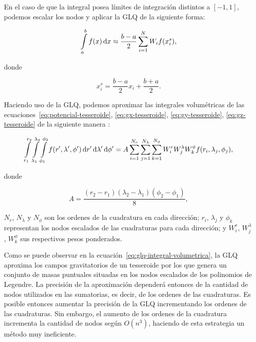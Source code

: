 En el caso de que la integral posea límites de integración distintos a
$[-1, 1]$, podemos escalar los nodos y aplicar la \ac{GLQ} de la siguiente
forma:

\begin{equation}
    \int\limits_a^b f(x) \mathop{}\!\textnormal{d} x \approx
        \frac{b - a}{2} \sum\limits_{i=1}^{N}
        W_i f(x_i^s),
\end{equation}

\noindent donde

\begin{equation}
    x_i^s = \frac{b - a}{2} x_i + \frac{b + a}{2}.
\end{equation}

Haciendo uso de la \ac{GLQ}, podemos aproximar las integrales volumétricas de
las ecuaciones~\ref{eq:potencial-tesseroide}, \ref{eq:gx-tesseroide},
\ref{eq:gy-tesseroide}, \ref{eq:gz-tesseroide} de la siguiente manera
\citep{asgharzadeh2007,uieda2016}:

\begin{equation}
    \int\limits_{r_1}^{r_2}
    \int\limits_{\lambda_1}^{\lambda_2}
    \int\limits_{\phi_1}^{\phi_2}
    f(r', \lambda', \phi')
    \mathop{}\!\textnormal{d} r' \mathop{}\!\textnormal{d} \lambda' \mathop{}\!\textnormal{d} \phi' =
    A
    \sum\limits_{i=1}^{N_r}
    \sum\limits_{j=1}^{N_\lambda}
    \sum\limits_{k=1}^{N_\phi}
    W_i^r
    W_j^\lambda
    W_k^\phi
    f(r_i, \lambda_j, \phi_j),
    \label{eq:glq-integral-volumetrica}
\end{equation}

\noindent donde

\begin{equation}
    A = \frac{
        (r_2 - r_1) (\lambda_2 - \lambda_1) (\phi_2 - \phi_1)
    }{8},
    \label{eq:glq-resize-factor}
\end{equation}

\noindent $N_r$, $N_\lambda$ y $N_\phi$ son los ordenes de la cuadratura en
cada dirección; $r_i$, $\lambda_j$ y $\phi_k$ representan los nodos escalados
de las cuadraturas para cada dirección; y $W_i^r$, $W_j^\lambda$, $W_k^\phi$
sus respectivos pesos ponderados.

Como se puede observar en la ecuación~\ref{eq:glq-integral-volumetrica}, la
\ac{GLQ} aproxima los campos gravitatorios de un tesseroide por los que genera
un conjunto de masas puntuales situadas en los nodos escalados de los
polinomios de Legendre.
La precisión de la aproximación dependerá entonces de la cantidad de nodos
utilizados en las sumatorias, es decir, de los ordenes de las cuadraturas.
Es posible entonces aumentar la precisión de la \ac{GLQ} incrementando los
ordenes de las cuadraturas.
Sin embargo, el aumento de los ordenes de la cuadratura incrementa la cantidad
de nodos según $O(n^3)$, haciendo de esta estrategia un método muy ineficiente.

